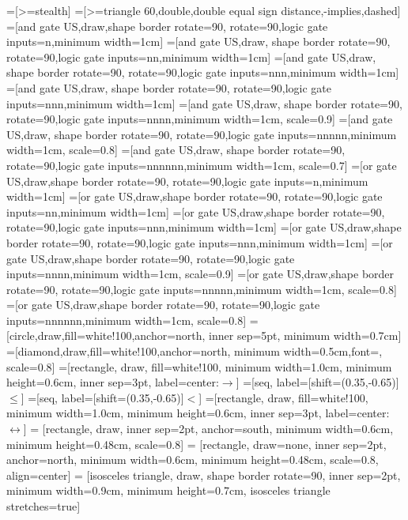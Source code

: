=[>=stealth]
=[>=triangle 60,double,double equal sign distance,-implies,dashed]
=[and gate US,draw,shape border rotate=90, rotate=90,logic gate inputs=n,minimum width=1cm]
=[and gate US,draw,  shape border rotate=90, rotate=90,logic gate inputs=nn,minimum width=1cm]
=[and gate US,draw, shape border rotate=90, rotate=90,logic gate inputs=nnn,minimum width=1cm]
=[and gate US,draw, shape border rotate=90, rotate=90,logic gate inputs=nnn,minimum width=1cm]
=[and gate US,draw, shape border rotate=90, rotate=90,logic gate inputs=nnnn,minimum width=1cm, scale=0.9]
=[and gate US,draw, shape border rotate=90, rotate=90,logic gate inputs=nnnnn,minimum width=1cm, scale=0.8]
=[and gate US,draw, shape border rotate=90, rotate=90,logic gate inputs=nnnnnn,minimum width=1cm, scale=0.7]
=[or gate US,draw,shape border rotate=90, rotate=90,logic gate inputs=n,minimum width=1cm]
=[or gate US,draw,shape border rotate=90, rotate=90,logic gate inputs=nn,minimum width=1cm]
=[or gate US,draw,shape border rotate=90, rotate=90,logic gate inputs=nnn,minimum width=1cm]
=[or gate US,draw,shape border rotate=90, rotate=90,logic gate inputs=nnn,minimum width=1cm]
=[or gate US,draw,shape border rotate=90, rotate=90,logic gate inputs=nnnn,minimum width=1cm, scale=0.9]
=[or gate US,draw,shape border rotate=90, rotate=90,logic gate inputs=nnnnn,minimum width=1cm, scale=0.8]
=[or gate US,draw,shape border rotate=90, rotate=90,logic gate inputs=nnnnnn,minimum width=1cm, scale=0.8]
=[circle,draw,fill=white!100,anchor=north, inner sep=5pt, minimum width=0.7cm]
=[diamond,draw,fill=white!100,anchor=north, minimum width=0.5cm,font=\scriptsize, scale=0.8]
=[rectangle, draw, fill=white!100, minimum width=1.0cm, minimum height=0.6cm, inner sep=3pt, label=center:{\LARGE$\rightarrow$}]
=[seq, label={[shift={(0.35,-0.65)}]\small{$\leq$}}]
=[seq, label={[shift={(0.35,-0.65)}]\small{$<$}}]
=[rectangle, draw, fill=white!100, minimum width=1.0cm, minimum height=0.6cm, inner sep=3pt, label=center:{\LARGE$\leftrightarrow$}]
 = [rectangle, draw, inner sep=2pt, anchor=south, minimum width=0.6cm, minimum height=0.48cm, scale=0.8]
 = [rectangle, draw=none, inner sep=2pt, anchor=north, minimum width=0.6cm, minimum height=0.48cm, scale=0.8, align=center]
 = [isosceles triangle, draw, shape border rotate=90, inner sep=2pt, minimum width=0.9cm, minimum height=0.7cm, isosceles triangle stretches=true]

